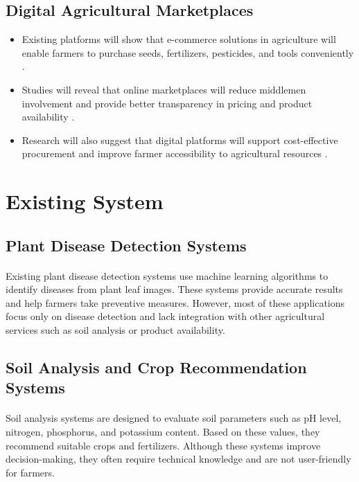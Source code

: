 \subsection{Digital Agricultural Marketplaces}
\begin{itemize}
    \item Existing platforms will show that e-commerce solutions in agriculture will enable farmers to purchase seeds, fertilizers, pesticides, and tools conveniently \cite{10}.
    \item Studies will reveal that online marketplaces will reduce middlemen involvement and provide better transparency in pricing and product availability \cite{11}.
    \item Research will also suggest that digital platforms will support cost-effective procurement and improve farmer accessibility to agricultural resources \cite{12}.
\end{itemize}

\newpage

\section{Existing System}

\subsection{Plant Disease Detection Systems}
\paragraph{}Existing plant disease detection systems use machine learning algorithms to identify diseases from plant leaf images. These systems provide accurate results and help farmers take preventive measures. However, most of these applications focus only on disease detection and lack integration with other agricultural services such as soil analysis or product availability.

\subsection{Soil Analysis and Crop Recommendation Systems}
\paragraph{}Soil analysis systems are designed to evaluate soil parameters such as pH level, nitrogen, phosphorus, and potassium content. Based on these values, they recommend suitable crops and fertilizers. Although these systems improve decision-making, they often require technical knowledge and are not user-friendly for farmers.

